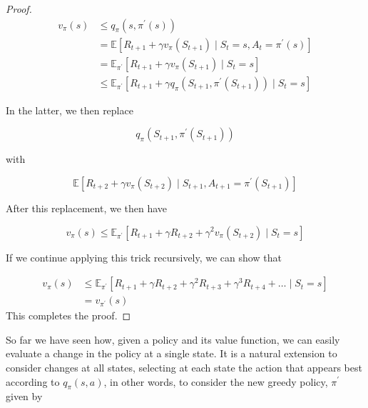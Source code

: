 \documentclass[11pt]{article}
\theoremstyle{plain} %
\theoremstyle{remark}
\begin{document}
\begin{proof}
  $$
    \begin{aligned}
      v_{\pi}(s) & \leq q_{\pi}\left(s, \pi^{\prime}(s)\right)                                                                                          \\
                 & =\mathbb{E}\left[R_{t+1}+\gamma v_{\pi}\left(S_{t+1}\right) \mid S_{t}=s, A_{t}=\pi^{\prime}(s)\right]                               \\
                 & =\mathbb{E}_{\pi^{\prime}}\left[R_{t+1}+\gamma v_{\pi}\left(S_{t+1}\right) \mid S_{t}=s\right]                                       \\
                 & \leq \mathbb{E}_{\pi^{\prime}}\left[R_{t+1}+\gamma q_{\pi}\left(S_{t+1}, \pi^{\prime}\left(S_{t+1}\right)\right) \mid S_{t}=s\right]
    \end{aligned}
  $$

  In the latter, we then replace

  $$
    q_{\pi}\left(S_{t+1}, \pi^{\prime}\left(S_{t+1}\right)\right)
  $$

  with

  $$
    \mathbb{E}\left[R_{t+2}+\gamma v_{\pi}\left(S_{t+2}\right) \mid S_{t+1}, A_{t+1}=\pi^{\prime}\left(S_{t+1}\right)\right]
  $$

  After this replacement, we then have

  $$
    v_{\pi}(s) \leq \mathbb{E}_{\pi^{\prime}}\left[R_{t+1}+\gamma R_{t+2}+\gamma^{2} v_{\pi}\left(S_{t+2}\right) \mid S_{t}=s\right]
  $$

  If we continue applying this trick recursively, we can show that

  $$
    \begin{aligned}
      v_{\pi}(s) & \leq \mathbb{E}_{\pi^{\prime}}\left[R_{t+1}+\gamma R_{t+2}+\gamma^{2} R_{t+3}+\gamma^{3} R_{t+4}+\ldots \mid S_{t}=s\right] \\
                 & =v_{\pi^{\prime}}(s)
    \end{aligned}
  $$
  This completes the proof.
\end{proof}

So far we have seen how, given a policy and its value function, we can
easily evaluate a change in the policy at a single state. It is a natural extension to consider changes at all states, selecting
at each state the action that appears best according to $q_{\pi}(s, a)$, in other words, to consider the new greedy policy, $\pi^{\prime}$
given by
\end{document}

